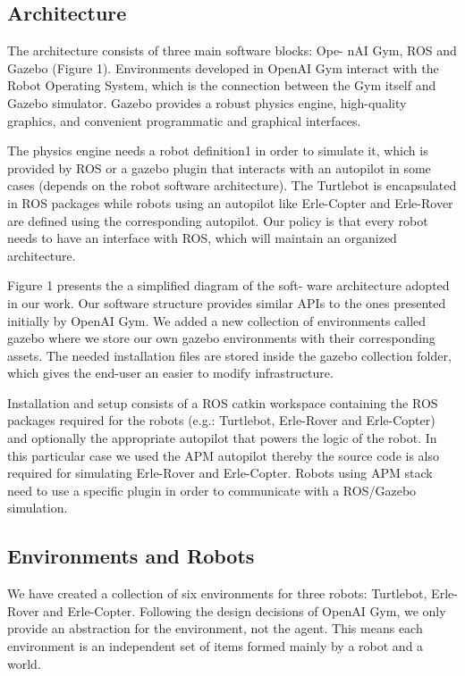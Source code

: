 \subsection{Architecture}

The architecture consists of three main software blocks: Ope- nAI Gym, ROS and Gazebo (Figure 1). Environments developed in OpenAI Gym interact with the Robot Operating System, which is the connection between the Gym itself and Gazebo simulator. Gazebo provides a robust physics engine, high-quality graphics, and convenient programmatic and graphical interfaces.

The physics engine needs a robot definition1 in order to simulate it, which is provided by ROS or a gazebo plugin that interacts with an autopilot in some cases (depends on the robot software architecture). The Turtlebot is encapsulated in ROS packages while robots using an autopilot like Erle-Copter and Erle-Rover are defined using the corresponding autopilot. Our policy is that every robot needs to have an interface with ROS, which will maintain an organized architecture.

Figure 1 presents the a simplified diagram of the soft- ware architecture adopted in our work. Our software structure provides similar APIs to the ones presented initially by OpenAI Gym. We added a new collection of environments called gazebo where we store our own gazebo environments with their corresponding assets. The needed installation files are stored inside the gazebo collection folder, which gives the end-user an easier to modify infrastructure.

Installation and setup consists of a ROS catkin workspace containing the ROS packages required for the robots (e.g.: Turtlebot, Erle-Rover and Erle-Copter) and optionally the appropriate autopilot that powers the logic of the robot. In this particular case we used the APM autopilot thereby the source code is also required for simulating Erle-Rover and Erle-Copter. Robots using APM stack need to use a specific plugin in order to communicate with a ROS/Gazebo simulation.

\subsection{Environments and Robots}

We have created a collection of six environments for three robots: Turtlebot, Erle-Rover and Erle-Copter. Following the design decisions of OpenAI Gym, we only provide an abstraction for the environment, not the agent. This means each environment is an independent set of items formed mainly by a robot and a world.

